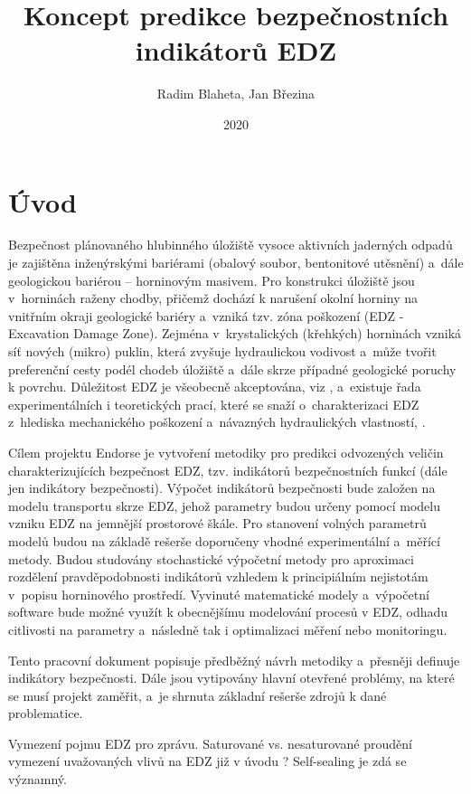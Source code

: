 \documentclass{article}
\title{Koncept predikce bezpečnostních indikátorů EDZ}
\author{Radim Blaheta, Jan Březina}
\date{2020}
\def\jb#1{{\color{violet}#1}}
\begin{document}
\maketitle


\section{Úvod}
Bezpečnost plánovaného hlubinného úložiště vysoce aktivních jaderných odpadů je zajištěna 
inženýrskými bariérami (obalový soubor, bentonitové utěsnění) a~dále geologickou bariérou 
– horninovým masivem. Pro konstrukci úložiště jsou v~horninách raženy chodby, přičemž dochází 
k narušení okolní horniny na vnitřním okraji geologické bariéry a~vzniká tzv. zóna poškození 
(EDZ - Excavation Damage Zone). 
Zejména v~krystalických (křehkých) horninách vzniká síť nových (mikro) puklin, která zvyšuje 
hydraulickou vodivost a~může tvořit preferenční cesty podél 
chodeb úložiště a~dále skrze případné geologické poruchy k povrchu.
Důležitost EDZ je všeobecně
akceptována, viz \cite{Pusch2008}, a~existuje řada experimentálních i teoretických prací, které se snaží o~charakterizaci EDZ z~hlediska mechanického poškození a~návazných hydraulických vlastností, \cite{Vavro2016}.

Cílem projektu Endorse je vytvoření metodiky pro predikci odvozených veličin charakterizujících 
bezpečnost EDZ, tzv. indikátorů bezpečnostních funkcí (dále jen indikátory bezpečnosti).
Výpočet indikátorů bezpečnosti bude založen na modelu transportu skrze EDZ, 
jehož parametry budou určeny pomocí modelu vzniku EDZ na jemnější prostorové škále. 
Pro stanovení volných parametrů modelů budou na základě rešerše doporučeny vhodné experimentální a~měřící metody.
Budou studovány stochastické výpočetní metody pro aproximaci rozdělení pravděpodobnosti indikátorů
vzhledem k principiálním nejistotám v~popisu horninového prostředí.
Vyvinuté matematické modely a~výpočetní software bude možné využít k obecnějšímu modelování procesů 
v EDZ, odhadu citlivosti na parametry a~následně tak i optimalizaci měření nebo monitoringu.



Tento pracovní dokument popisuje předběžný návrh metodiky a~přesněji definuje indikátory 
bezpečnosti. Dále jsou vytipovány hlavní otevřené problémy, na které se musí projekt zaměřit, a~je 
shrnuta základní rešerše zdrojů k dané problematice. 

\jb{Vymezení pojmu EDZ pro zprávu.}
\jb{Saturované vs. nesaturované proudění}
\jb{vymezení uvažovaných vlivů na EDZ již v úvodu ? Self-sealing je zdá se významný.}
\end{document}
